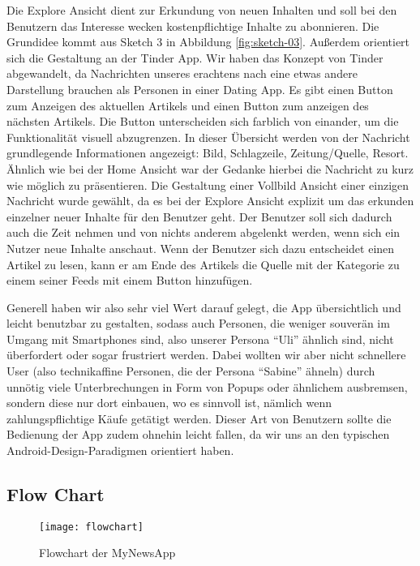 Die Explore Ansicht dient zur Erkundung von neuen Inhalten und soll bei den Benutzern das Interesse wecken kostenpflichtige Inhalte zu abonnieren. Die Grundidee kommt aus Sketch 3 in Abbildung \ref{fig:sketch-03}. Außerdem orientiert sich die Gestaltung an der Tinder App. Wir haben das Konzept von Tinder abgewandelt, da Nachrichten unseres erachtens nach eine etwas andere Darstellung brauchen als Personen in einer Dating App. Es gibt einen Button zum Anzeigen des aktuellen Artikels und einen Button zum anzeigen des nächsten Artikels. Die Button unterscheiden sich farblich von einander, um die Funktionalität visuell abzugrenzen. In dieser Übersicht werden von der Nachricht grundlegende Informationen angezeigt: Bild, Schlagzeile, Zeitung/Quelle, Resort. Ähnlich wie bei der Home Ansicht war der Gedanke hierbei die Nachricht zu kurz wie möglich zu präsentieren. Die Gestaltung einer Vollbild Ansicht einer einzigen Nachricht wurde gewählt, da es bei der Explore Ansicht explizit um das erkunden einzelner neuer Inhalte für den Benutzer geht. Der Benutzer soll sich dadurch auch die Zeit nehmen und von nichts anderem abgelenkt werden, wenn sich ein Nutzer neue Inhalte anschaut. Wenn der Benutzer sich dazu entscheidet einen Artikel zu lesen, kann er am Ende des Artikels die Quelle mit der Kategorie zu einem seiner Feeds mit einem Button hinzufügen.

Generell haben wir also sehr viel Wert darauf gelegt, die App übersichtlich und leicht benutzbar zu gestalten, sodass auch Personen, die weniger souverän im Umgang mit Smartphones sind, also unserer Persona \enquote{Uli} ähnlich sind, nicht überfordert oder sogar frustriert werden. Dabei wollten wir aber nicht schnellere User (also technikaffine Personen, die der Persona \enquote{Sabine} ähneln) durch unnötig viele Unterbrechungen in Form von Popups oder ähnlichem ausbremsen, sondern diese nur dort einbauen, wo es sinnvoll ist, nämlich wenn zahlungspflichtige Käufe getätigt werden. Dieser Art von Benutzern sollte die Bedienung der App zudem ohnehin leicht fallen, da wir uns an den typischen Android-Design-Paradigmen orientiert haben.

\subsection{Flow Chart}

\begin{figure}[H]
  \centering
  \texttt{[image: flowchart]}
  \caption{Flowchart der MyNewsApp}
  \label{fig:flowchart}
\end{figure}
